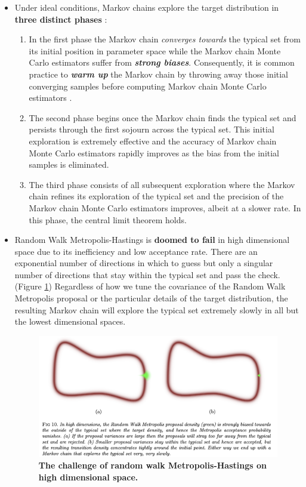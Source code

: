 \documentclass[11pt]{article}
\begin{document}
\begin{itemize}
\item Under ideal conditions, Markov chains explore the target distribution in \textbf{three distinct phases} \citep{betancourt2017conceptual}:
\begin{enumerate}
\item In the first phase the Markov chain \emph{converges towards} the typical set from its initial position in parameter space while the Markov chain Monte Carlo estimators suffer from \emph{\textbf{strong biases}}. Consequently, it is common practice to \emph{\textbf{warm up}} the Markov chain by throwing away those initial converging samples before computing Markov chain Monte Carlo estimators \citep{liu2001monte}. 
\item The second phase begins once the Markov chain finds the typical set and persists through the first sojourn across the typical set. This initial exploration is extremely effective and the accuracy of Markov chain Monte Carlo estimators rapidly improves as the bias from the initial samples is eliminated.
\item The third phase consists of all subsequent exploration where the Markov chain refines its exploration of the typical set and the precision of the Markov chain Monte Carlo estimators improves, albeit at a slower rate. In this phase, the central limit theorem holds.
\end{enumerate}

\item Random Walk Metropolis-Hastings is \textbf{doomed to fail} in high dimensional space due to its inefficiency and low acceptance rate. There are an exponential number of directions in which to guess but only a singular number of directions that stay within the typical set and pass the check. (Figure \ref{fig: random_walk_high_dim}) Regardless of how we tune the covariance of the Random Walk Metropolis proposal or the particular details of the target distribution, the resulting Markov chain will explore the typical set extremely slowly in all but the lowest dimensional spaces. 

\begin{figure}
\begin{minipage}[t]{1\linewidth}
  \centering
  \centerline{\includegraphics[scale = 0.5]{random_walk_high_dim.png}}
\end{minipage}
\caption{\footnotesize{\textbf{The challenge of random walk Metropolis-Hastings on high dimensional space.  \citep{betancourt2017conceptual}}}}
\label{fig: random_walk_high_dim}
\end{figure}


\end{itemize}
\end{document}
